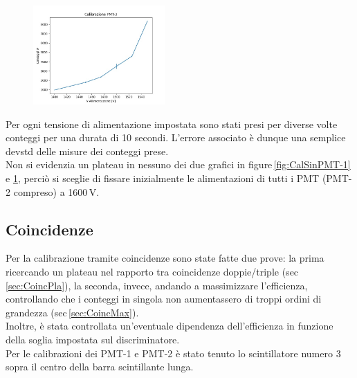 \documentclass[a4paper,twocolumn]{article}
\begin{document}
\begin{figure}[H]
\centering
\includegraphics[width=0.45\textwidth]{./immagini/TimeOfFlight/CalSinPMT-3}
\caption{}
\label{fig:CalSinPMT-3}
\end{figure}

Per ogni tensione di alimentazione impostata sono stati presi per diverse volte conteggi per una durata di 10 secondi. L'errore associato è dunque una semplice devstd delle misure dei conteggi prese.\\
Non si evidenzia un plateau in nessuno dei due grafici in figure\,\ref{fig:CalSinPMT-1} e \ref{fig:CalSinPMT-3}, perciò si sceglie di fissare inizialmente le alimentazioni di tutti i PMT (PMT-2 compreso) a 1600\,V.

\subsection{Coincidenze}
\label{sec:Coinc}
Per la calibrazione tramite coincidenze sono state fatte due prove: la prima ricercando un plateau nel rapporto tra coincidenze doppie/triple (sec\,\ref{sec:CoincPla}), la seconda, invece, andando a massimizzare l'efficienza, controllando che i conteggi in singola non aumentassero di troppi ordini di grandezza (sec\,\ref{sec:CoincMax}).\\
Inoltre, è stata controllata un'eventuale dipendenza dell'efficienza in funzione della soglia impostata sul discriminatore.\\
Per le calibrazioni dei PMT-1 e PMT-2 è stato tenuto lo scintillatore numero 3 sopra il centro della barra scintillante lunga.
\end{document}
